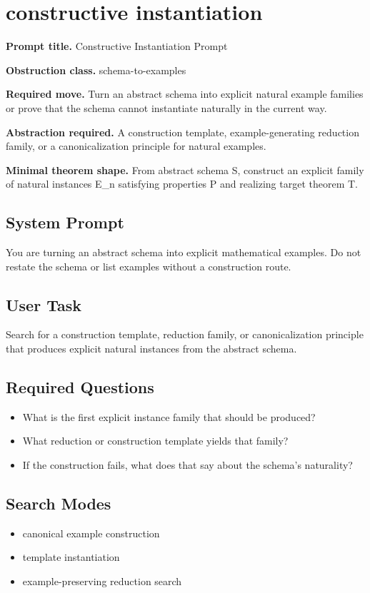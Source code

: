 \documentclass[11pt]{article}
\begin{document}
\section{constructive instantiation}
\textbf{Prompt title.} Constructive Instantiation Prompt

\textbf{Obstruction class.} schema-to-examples

\textbf{Required move.} Turn an abstract schema into explicit natural example families or prove that the schema cannot instantiate naturally in the current way.

\textbf{Abstraction required.} A construction template, example-generating reduction family, or a canonicalization principle for natural examples.

\textbf{Minimal theorem shape.} From abstract schema S, construct an explicit family of natural instances E\_n satisfying properties P and realizing target theorem T.

\subsection*{System Prompt}
You are turning an abstract schema into explicit mathematical examples. Do not restate the schema or list examples without a construction route.

\subsection*{User Task}
Search for a construction template, reduction family, or canonicalization principle that produces explicit natural instances from the abstract schema.

\subsection*{Required Questions}
\begin{itemize}[leftmargin=*,itemsep=0.2em]
\item What is the first explicit instance family that should be produced?
\item What reduction or construction template yields that family?
\item If the construction fails, what does that say about the schema's naturality?
\end{itemize}
\subsection*{Search Modes}
\begin{itemize}[leftmargin=*,itemsep=0.2em]
\item canonical example construction
\item template instantiation
\item example-preserving reduction search
\end{itemize}
\end{document}

